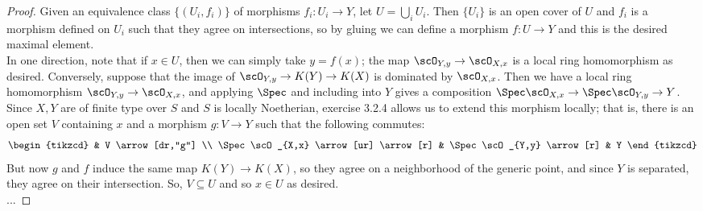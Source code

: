 \begin{proof}
	Given an equivalence class $\{(U_i,f_i)\}$ of morphisms $f_i : U_i \to Y$, let $U = \bigcup_i U_i$. Then $\{U_i\}$ is an open cover of $U$ and $f_i$ is a morphism defined on $U_i$ such that they agree on intersections, so by gluing we can define a morphism $f : U \to Y$ and this is the desired maximal element. \\
	
	In one direction, note that if $x \in U$, then we can simply take $y = f(x)$; the map $\scO_{Y,y} \to \scO_{X,x}$ is a local ring homomorphism as desired. Conversely, suppose that the image of $\scO_{Y,y} \to K(Y) \to K(X)$ is dominated by $\scO_{X,x}$. Then we have a local ring homomorphism $\scO_{Y,y} \to \scO_{X,x}$, and applying $\Spec$ and including into $Y$ gives a composition $\Spec\scO_{X,x} \to \Spec\scO_{Y,y} \to Y$. Since $X,Y$ are of finite type over $S$ and $S$ is locally Noetherian, exercise 3.2.4 allows us to extend this morphism locally; that is, there is an open set $V$ containing $x$ and a morphism $g : V \to Y$ such that the following commutes:
	\[ \begin{tikzcd} & V \arrow[dr,"g"] \\ \Spec\scO_{X,x} \arrow[ur] \arrow[r] & \Spec\scO_{Y,y} \arrow[r] & Y \end{tikzcd} \]
	But now $g$ and $f$ induce the same map $K(Y) \to K(X)$, so they agree on a neighborhood of the generic point, and since $Y$ is separated, they agree on their intersection. So, $V \subseteq U$ and so $x \in U$ as desired. \\
	
	...
\end{proof}
